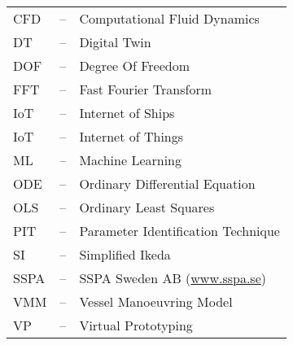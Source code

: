 
\begin{tabular}{ l c l }
CFD & -- & Computational Fluid Dynamics\\
DT  & -- & Digital Twin\\
DOF & -- & Degree Of Freedom\\
FFT & -- & Fast Fourier Transform\\
IoT & -- & Internet of Ships \\
IoT & -- & Internet of Things \\
ML & -- & Machine Learning \\
ODE & -- & Ordinary Differential Equation\\
OLS & -- & Ordinary Least Squares\\
PIT & -- & Parameter Identification Technique\\
SI  & -- & Simplified Ikeda\\
SSPA & -- & SSPA Sweden AB (\url{www.sspa.se})\\
VMM & -- & Vessel Manoeuvring Model\\
VP & -- & Virtual Prototyping \\
\end{tabular}
